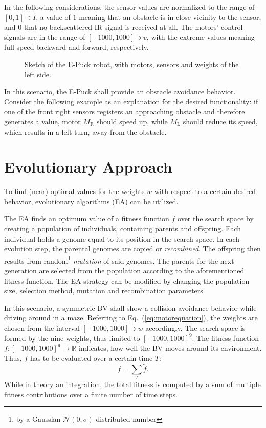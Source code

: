 \documentclass[a4paper]{jacow}
\begin{document}
In the following considerations, the sensor values are normalized to the range of $[0,1]\ni I$, a value of $1$ meaning that an obstacle is in close vicinity to the sensor, and $0$ that no backscattered IR signal is received at all. The motors' control signals are in the range of $[-1000,1000]\ni v$, with the extreme values meaning full speed backward and forward, respectively.

\begin{figure}[hbt]
	\centering
	
	\caption{Sketch of the E-Puck robot, with motors, sensors and weights of the left side.}
	\label{fig:epuck}
\end{figure}

In this scenario, the E-Puck shall provide an obstacle avoidance behavior. Consider the following example as an explanation for the desired functionality: if one of the front right sensors registers an approaching obstacle and therefore generates a value, motor $M_\mathrm{R}$ should speed up, while $M_\mathrm{L}$ should reduce its speed, which results in a left turn, away from the obstacle.

\section{Evolutionary Approach}

To find (near) optimal values for the weights $w$ with respect to a certain desired behavior, evolutionary algorithms (EA) can be utilized.

The EA finds an optimum value of a fitness function $f$ over the search space by creating a population of individuals, containing parents and offspring. Each individual holds a genome equal to its position in the search space. In each evolution step, the parental genomes are copied or \emph{recombined}. The offspring then results from random\footnote{by a Gaussian $\mathcal{N}(0,\sigma)$ distributed number} \emph{mutation} of said genomes. The parents for the next generation are selected from the population according to the aforementioned fitness function. The EA strategy can be modified by changing the population size, selection method, mutation and recombination parameters.

In this scenario, a symmetric BV shall show a collision avoidance behavior while driving around in a maze. Referring to Eq.~(\ref{eq:motorequation}), the weights are chosen from the interval $[-1000,1000]\ni w$ accordingly. The search space is formed by the nine weights, thus limited to $[-1000,1000]^9$. The fitness function \mbox{$f:[-1000,1000]^9\to \mathbb{R}$} indicates, how well the BV moves around its environment. Thus, $f$ has to be evaluated over a certain time $T$:
\begin{equation}
	f = \sum\limits_T \tilde{f}.
\end{equation}
While in theory an integration, the total fitness is computed by a sum of multiple fitness contributions over a finite number of time steps. 
\end{document}
